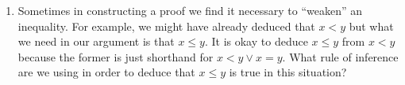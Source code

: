 \begin{enumerate}
 \rule{0pt}{0pt}
 
 \wbvfill
 
\item Sometimes in constructing a proof we find it necessary to ``weaken'' an inequality.  For example,
we might have already deduced that $x < y$ but what we need in our argument is that $x \leq y$.  It is
okay to deduce $x \leq y$ from $x < y$ because the former is just shorthand for $x<y \lor x=y$.  What
rule of inference are we using in order to deduce that $x \leq y$ is true in this situation?


\wbvfill

\end{enumerate}
